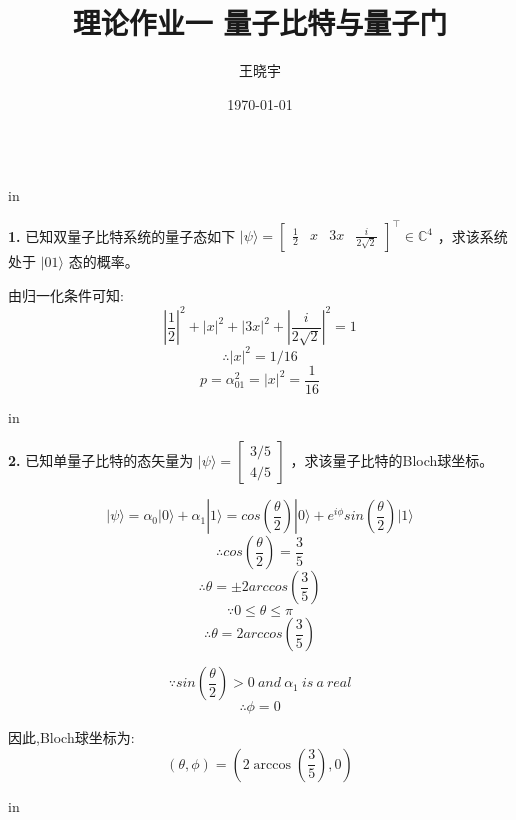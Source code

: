\documentclass[11pt]{article}
\begin{document}
\title{{\bf 理论作业一 \quad 量子比特与量子门}}
\author{王晓宇 }
\date{\today}
\maketitle

\begin{tabular*}{13cm}{r}
\hline
\end{tabular*}

 in

{\bf 1.} 已知双量子比特系统的量子态如下 $|\psi\rangle = \begin{bmatrix} \frac{1}{2} & x & 3x & \frac{i}{2\sqrt{2}} \end{bmatrix} ^ \intercal \in \mathbb{C}^4$ ，求该系统处于 $|01\rangle$ 态的概率。

由归一化条件可知:
$$\left | \frac{1}{2} \right |^2 + \left | x \right |^2 + \left | 3x \right |^2 + \left | \frac{i}{2\sqrt{2}}  \right |^2 = 1$$
$$\therefore \left| x \right|^2 = 1/16$$
$$ p = \alpha_{01}^2 = \left| x \right|^2 = \frac{1}{16}$$

 in

{\bf 2.} 已知单量子比特的态矢量为 $|\psi\rangle = \begin{bmatrix} 3/5 \\ 4/5 \end{bmatrix}$ ，求该量子比特的Bloch球坐标。

$$|\psi\rangle = \alpha_{0}|0\rangle + \alpha_{1}|1\rangle = cos\left(\frac{\theta}{2}\right)|0\rangle + e^{i\phi}sin\left(\frac{\theta}{2}\right)|1\rangle$$
$$\therefore cos\left(\frac{\theta}{2}\right) = \frac{3}{5}$$
$$\therefore \theta = \pm 2arccos(\frac{3}{5})$$
\[ \because 0 \le \theta \le \pi \] 
\[ \therefore \theta =  2arccos(\frac{3}{5})  \]

\[ \because sin\left( \frac{\theta}{2}\right) >0 \ and \ \alpha_{1} \ is \ a \ real \]
$$\therefore \phi = 0 $$

因此,Bloch球坐标为:
\[ (\theta, \phi) = \left(2 \arccos\left(\frac{3}{5}\right), 0\right) \]


 in
\end{document}
